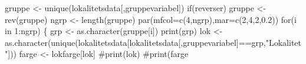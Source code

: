 \documentclass[
  letterpaper,
  DIV=11,
  numbers=noendperiod]{scrreport}
\newenvironment{Shaded}{\begin{snugshade}}{\end{snugshade}}
\newcommand{\AttributeTok}[1]{\textcolor[rgb]{0.40,0.45,0.13}{#1}}
\newcommand{\CommentTok}[1]{\textcolor[rgb]{0.37,0.37,0.37}{#1}}
\newcommand{\ControlFlowTok}[1]{\textcolor[rgb]{0.00,0.23,0.31}{#1}}
\newcommand{\DecValTok}[1]{\textcolor[rgb]{0.68,0.00,0.00}{#1}}
\newcommand{\FloatTok}[1]{\textcolor[rgb]{0.68,0.00,0.00}{#1}}
\newcommand{\FunctionTok}[1]{\textcolor[rgb]{0.28,0.35,0.67}{#1}}
\newcommand{\NormalTok}[1]{\textcolor[rgb]{0.00,0.23,0.31}{#1}}
\newcommand{\OtherTok}[1]{\textcolor[rgb]{0.00,0.23,0.31}{#1}}
\newcommand{\SpecialCharTok}[1]{\textcolor[rgb]{0.37,0.37,0.37}{#1}}
\newcommand{\StringTok}[1]{\textcolor[rgb]{0.13,0.47,0.30}{#1}}
\begin{document}
\begin{Shaded}
\begin{Highlighting}[]
\NormalTok{  gruppe }\OtherTok{\textless{}{-}} \FunctionTok{unique}\NormalTok{(lokalitetsdata[,gruppevariabel])}
  \ControlFlowTok{if}\NormalTok{(reverser) gruppe }\OtherTok{\textless{}{-}} \FunctionTok{rev}\NormalTok{(gruppe)}
\NormalTok{  ngrp }\OtherTok{\textless{}{-}} \FunctionTok{length}\NormalTok{(gruppe)}
  \FunctionTok{par}\NormalTok{(}\AttributeTok{mfcol=}\FunctionTok{c}\NormalTok{(}\DecValTok{4}\NormalTok{,ngrp),}\AttributeTok{mar=}\FunctionTok{c}\NormalTok{(}\DecValTok{2}\NormalTok{,}\DecValTok{4}\NormalTok{,}\DecValTok{2}\NormalTok{,}\FloatTok{0.2}\NormalTok{))}
  \ControlFlowTok{for}\NormalTok{(i }\ControlFlowTok{in} \DecValTok{1}\SpecialCharTok{:}\NormalTok{ngrp)}
\NormalTok{  \{}
\NormalTok{    grp }\OtherTok{\textless{}{-}} \FunctionTok{as.character}\NormalTok{(gruppe[i])}
    \FunctionTok{print}\NormalTok{(grp)}
\NormalTok{    lok }\OtherTok{\textless{}{-}} \FunctionTok{as.character}\NormalTok{(}\FunctionTok{unique}\NormalTok{(lokalitetsdata[lokalitetsdata[,gruppevariabel]}\SpecialCharTok{==}\NormalTok{grp,}\StringTok{"Lokalitet"}\NormalTok{]))}
\NormalTok{    farge }\OtherTok{\textless{}{-}}\NormalTok{ lokfarge[lok]}
    \CommentTok{\#print(lok)}
    \CommentTok{\#print(farge}
    

\end{Highlighting}
\end{Shaded}
\end{document}
